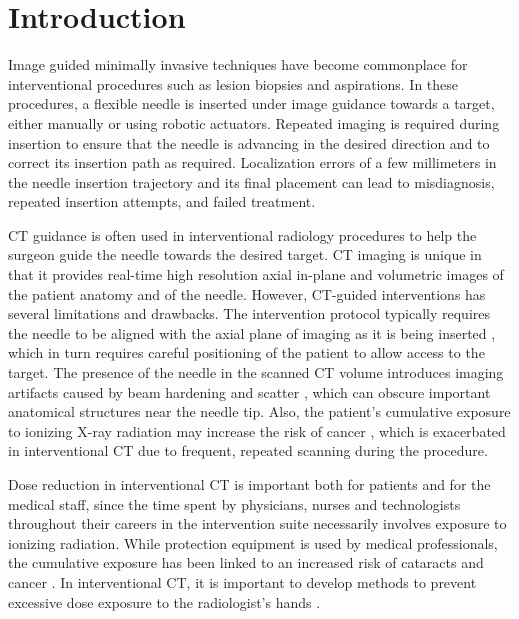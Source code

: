 \section*{Introduction}

Image guided minimally invasive techniques have become commonplace for interventional procedures such as lesion biopsies and aspirations.
In these procedures, a flexible needle is inserted under image guidance towards a target, either manually or using robotic actuators. Repeated imaging is required during insertion to ensure that the needle is advancing in the desired direction and to correct its insertion path as required. Localization errors of a few millimeters in the needle insertion trajectory and its final placement can lead to misdiagnosis, repeated insertion attempts, and failed treatment.

CT guidance is often used in interventional radiology procedures to help the surgeon guide the needle towards the desired target. CT imaging is unique in that it provides real-time high resolution axial in-plane and volumetric images of the patient anatomy and of the needle. However, CT-guided interventions has several limitations and drawbacks. The intervention protocol typically requires the needle to be aligned with the axial plane of imaging as it is being inserted \cite{gupta2014ct}, which in turn requires careful positioning of the patient to allow access to the target.  The presence of the needle in the scanned CT volume introduces imaging artifacts caused by beam hardening and scatter \cite{boas2012ctartifacts}, which can obscure important anatomical structures near the needle tip. Also, the patient's cumulative exposure to ionizing X-ray radiation may increase the risk of cancer \cite{mettler2000ct,chodick2007excess}, which is exacerbated in interventional CT due to frequent, repeated scanning during the procedure.

Dose reduction in interventional CT is important both for patients and for the medical staff, since the time spent by physicians, nurses and technologists throughout their careers in the intervention suite necessarily involves exposure to ionizing radiation. While protection equipment is used by medical professionals, the cumulative exposure has been linked to an increased risk of cataracts and cancer \cite{miller2010occupational, sarti2012low}. In interventional CT, it is important to develop methods to prevent excessive dose exposure to the radiologist's hands \cite{stoeckelhuber2005radiation}.

